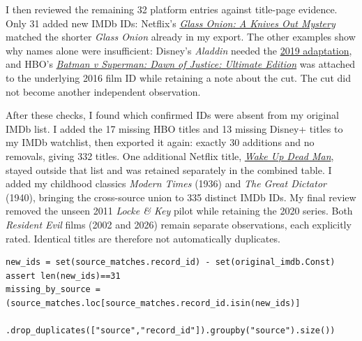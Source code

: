 \documentclass[11pt,letterpaper]{article}
\begin{document}
I then reviewed the remaining 32 platform entries against title-page evidence. Only 31 added new IMDb IDs: Netflix's \href{https://www.imdb.com/title/tt11564570/}{\emph{Glass Onion: A Knives Out Mystery}} matched the shorter \emph{Glass Onion} already in my export. The other examples show why names alone were insufficient: Disney's \emph{Aladdin} needed the \href{https://www.imdb.com/title/tt6139732/}{2019 adaptation}, and HBO's \href{https://www.imdb.com/title/tt2975590/}{\emph{Batman v Superman: Dawn of Justice: Ultimate Edition}} was attached to the underlying 2016 film ID while retaining a note about the cut. The cut did not become another independent observation.

After these checks, I found which confirmed IDs were absent from my original IMDb list. I added the 17 missing HBO titles and 13 missing Disney+ titles to my IMDb watchlist, then exported it again: exactly 30 additions and no removals, giving 332 titles. One additional Netflix title, \href{https://www.imdb.com/title/tt14364480/}{\emph{Wake Up Dead Man}}, stayed outside that list and was retained separately in the combined table. I added my childhood classics \emph{Modern Times} (1936) and \emph{The Great Dictator} (1940), bringing the cross-source union to 335 distinct IMDb IDs. My final review removed the unseen 2011 \emph{Locke \& Key} pilot while retaining the 2020 series. Both \emph{Resident Evil} films (2002 and 2026) remain separate observations, each explicitly rated. Identical titles are therefore not automatically duplicates.

\begin{lstlisting}[caption={After reviewing identities, a set difference on IMDb IDs finds platform titles absent from the original list; source-level counts retain platform provenance.}]
new_ids = set(source_matches.record_id) - set(original_imdb.Const)
assert len(new_ids)==31
missing_by_source = (source_matches.loc[source_matches.record_id.isin(new_ids)]
                    .drop_duplicates(["source","record_id"]).groupby("source").size())
\end{lstlisting}
\end{document}

